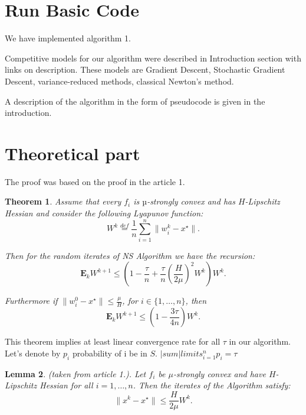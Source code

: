 \documentclass{article}
\newtheorem{theorem}{Theorem}
\newtheorem{lemma}[theorem]{Lemma}
\begin{document}
\section{Run Basic Code}
We have implemented algorithm 1. 

Competitive models for our algorithm were described in Introduction section with links on description. These models are  Gradient Descent, Stochastic Gradient Descent, variance-reduced methods, classical Newton's method.

A description of the algorithm in the form of pseudocode is given in the introduction.

\section{Theoretical part}

The proof was based on the proof in the article 1.

\begin{theorem} Assume that every $f_i$ is $µ$-strongly convex and has $H$-Lipschitz Hessian and consider
the following Lyapunov function:
\begin{equation}
    W^k \overset{def}{=} \frac{1}{n}\sum\limits_{i=1}^{n}\|w_i^k - x^\star\|.
\end{equation}

Then for the random iterates of NS Algorithm we have the recursion:
\begin{equation}
    \mathbf{E}_k W^{k + 1} \leq \left(1 - \frac{\tau}{n} +
    \frac{\tau}{n}\left(\frac{H}{2\mu}\right)^2W^k\right)W^k.
\end{equation}

Furthermore if $\|w_i^0 - x^\star\| \leq \frac{\mu}{H}$, for $i \in \{1, \dots, n\}$, then
\begin{equation}
    \mathbf{E}_k W^{k + 1} \leq \left(1 - \frac{3\tau}{4n}\right)W^k.
\end{equation}
\end{theorem}

This theorem implies at least linear convergence rate for all $\tau$ in our algorithm.
Let's denote by $p_i$ probability of i be in $S$. $|sum|limits_{i=1}^n p_i = \tau$

\begin{lemma} (taken from article 1.).
Let $f_i$ be $\mu$-strongly convex and have $H$-Lipschitz Hessian for all $i = 1, \dots, n$. Then
the iterates of the Algorithm satisfy:
\begin{equation}
    \|x^k - x^\star\| \leq \frac{H}{2\mu}W^k.
\end{equation}
\end{lemma}
\end{document}
